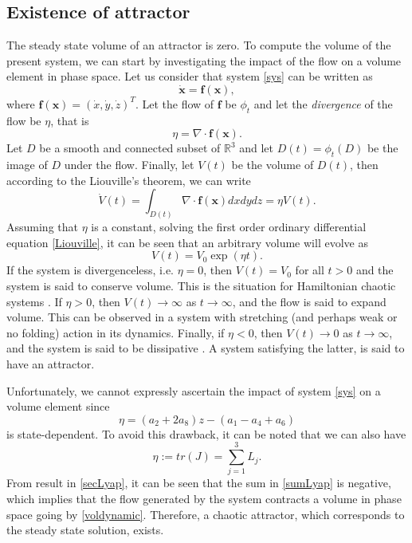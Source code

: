\documentclass[final,5p,times,twocolumn]{elsarticle}
\begin{document}
\subsection{Existence of attractor\label{phasevol}}
The steady state volume of an attractor is zero. To compute the volume of the present system, we can start by investigating the impact of the flow on a volume element in phase space. Let us consider that system \eqref{sys} can be written as
\begin{equation}
\dot{\bm{x}} = \bm{f}(\bm{x}),
\end{equation}
where $\bm{f}(\bm{x})=(\dot{x},\dot{y},\dot{z})^T$. Let the flow of $\bm{f}$ be $\phi_t$ and let the \textit{divergence} of the flow be $\eta$, that is
\begin{equation}
\eta = \nabla\cdot\bm{f}(\bm{x}).  
\end{equation}
Let $D$ be a smooth and connected subset of $\mathbb{R}^3$ and let $D(t) = \phi_t(D)$ be the image of $D$ under the flow. Finally, let $V(t)$ be the volume of $D(t)$, then according to the Liouville's theorem, we can write
\begin{equation}
\dot{V}(t) = \int_{D(t)}\nabla\cdot\bm{f}(\bm{x})dxdydz = \eta V(t)\label{Liouville}.
\end{equation}
Assuming that $\eta$ is a constant, solving the first order ordinary differential equation \eqref{Liouville},  it can be seen that an arbitrary volume will evolve as
\begin{equation}
V(t) = V_0\exp(\eta t)\label{voldynamic}.
\end{equation}
If the system is divergenceless, i.e. $\eta=0$, then $V(t) = V_0$ for all $t>0$ and the system is said to conserve volume. This is the situation for Hamiltonian chaotic systems \cite{IJET16826}. If $\eta>0$, then $V(t)\rightarrow\infty$ as $t\rightarrow\infty$, and the flow is said to expand volume. This can be observed in a system with stretching (and perhaps weak or no folding) action in its dynamics. Finally, if $\eta<0$, then $V(t)\rightarrow 0$ as $t\rightarrow\infty$, and the system is said to be dissipative \cite{yu2019analysis}. A system satisfying the latter, is said to have an attractor.

Unfortunately, we cannot expressly ascertain the impact of system \eqref{sys} on a volume element since
\begin{equation}
\eta =(a_2+2a_8)z-(a_1-a_4+a_6)\label{gradv1}
\end{equation} 
is state-dependent. To avoid this drawback, it can be noted that we can also have \cite{sprott1994some}
\begin{equation}
\eta := tr(J) = \sum_{j=1}^{3}L_j\label{sumLyap}. 
\end{equation} 
From result in \cref{secLyap}, it can be seen that the sum in \eqref{sumLyap} is negative, which implies that the flow generated by the system contracts a volume in phase space going by \eqref{voldynamic}. Therefore, a chaotic attractor, which corresponds to the steady state solution, exists.
\end{document}
